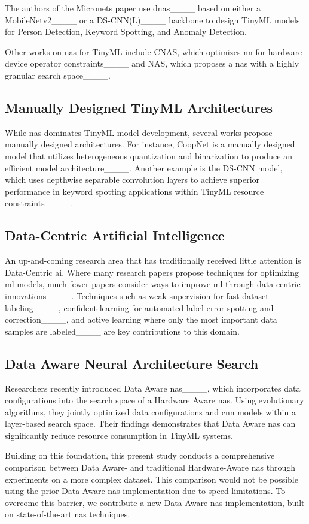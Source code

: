 The authors of the Micronets paper use \gls{dnas}____ based on either a MobileNetv2____ or a DS-CNN(L)____ backbone to design TinyML models for Person Detection, Keyword Spotting, and Anomaly Detection.

Other works on \gls{nas} for TinyML include CNAS, which optimizes \gls{nn} for hardware device operator constraints____ and \textmu{}NAS, which proposes a \gls{nas} with a highly granular search space____.

\subsection{Manually Designed TinyML Architectures}
While \gls{nas} dominates TinyML model development, several works propose manually designed architectures.
For instance, CoopNet is a manually designed model that utilizes heterogeneous quantization and binarization to produce an efficient model architecture____.
Another example is the DS-CNN model, which uses depthwise separable convolution layers to achieve superior performance in keyword spotting applications within TinyML resource constraints____.

\subsection{Data-Centric Artificial Intelligence}
An up-and-coming research area that has traditionally received little attention is Data-Centric \gls{ai}.
Where many research papers propose techniques for optimizing \gls{ml} models, much fewer papers consider ways to improve \gls{ml} through data-centric innovations____.
Techniques such as weak supervision for fast dataset labeling____, confident learning for automated label error spotting and correction____, and active learning where only the most important data samples are labeled____ are key contributions to this domain.

\subsection{Data Aware Neural Architecture Search}
Researchers recently introduced Data Aware \gls{nas}____, which incorporates data configurations into the search space of a Hardware Aware \gls{nas}.
Using evolutionary algorithms, they jointly optimized data configurations and \gls{cnn} models within a layer-based search space.
Their findings demonstrates that Data Aware \gls{nas} can significantly reduce resource consumption in TinyML systems.

Building on this foundation, this present study conducts a comprehensive comparison between Data Aware- and traditional Hardware-Aware \gls{nas} through experiments on a more complex dataset.
This comparison would not be possible using the prior Data Aware \gls{nas} implementation due to speed limitations.
To overcome this barrier, we contribute a new Data Aware \gls{nas} implementation, built on state-of-the-art \gls{nas} techniques.